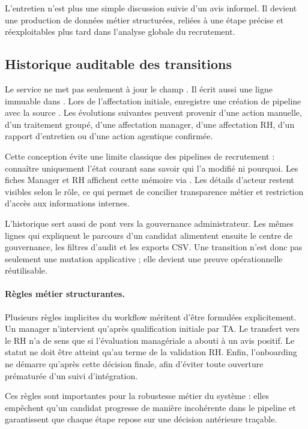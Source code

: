 L'entretien n'est plus une simple discussion suivie d'un avis informel. Il devient une production de données métier structurées, reliées à une étape précise et réexploitables plus tard dans l'analyse globale du recrutement.


\subsection{Historique auditable des transitions}
Le service  ne met pas seulement à jour le champ . Il écrit aussi une ligne immuable dans . Lors de l'affectation initiale,  enregistre une création de pipeline avec la source . Les évolutions suivantes peuvent provenir d'une action manuelle, d'un traitement groupé, d'une affectation manager, d'une affectation RH, d'un rapport d'entretien ou d'une action agentique confirmée.

Cette conception évite une limite classique des pipelines de recrutement : connaître uniquement l'état courant sans savoir qui l'a modifié ni pourquoi. Les fiches Manager et RH affichent cette mémoire via . Les détails d'acteur restent visibles selon le rôle, ce qui permet de concilier transparence métier et restriction d'accès aux informations internes.

L'historique sert aussi de pont vers la gouvernance administrateur. Les mêmes lignes qui expliquent le parcours d'un candidat alimentent ensuite le centre de gouvernance, les filtres d'audit et les exports CSV. Une transition n'est donc pas seulement une mutation applicative ; elle devient une preuve opérationnelle réutilisable.
\paragraph{Règles métier structurantes.}
Plusieurs règles implicites du workflow méritent d'être formulées explicitement. Un manager n'intervient qu'après qualification initiale par TA. Le transfert vers le RH n'a de sens que si l'évaluation managériale a abouti à un avis positif. Le statut  ne doit être atteint qu'au terme de la validation RH. Enfin, l'onboarding ne démarre qu'après cette décision finale, afin d'éviter toute ouverture prématurée d'un suivi d'intégration.

Ces règles sont importantes pour la robustesse métier du système : elles empêchent qu'un candidat progresse de manière incohérente dans le pipeline et garantissent que chaque étape repose sur une décision antérieure traçable.

